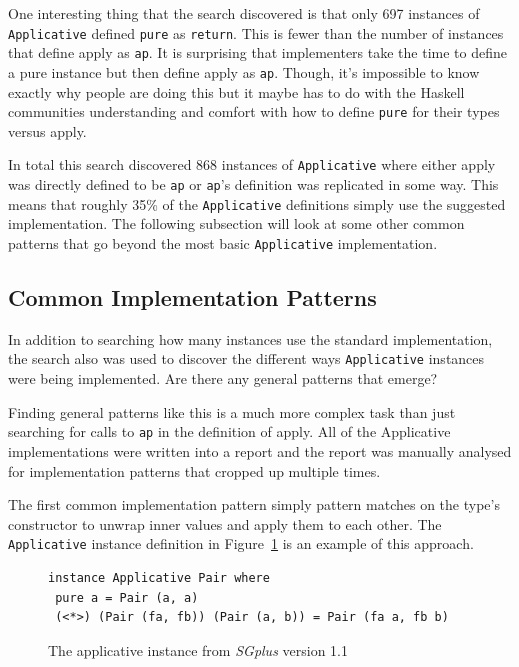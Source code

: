 One interesting thing that the search discovered is that only 697 instances of \texttt{Applicative} defined \texttt{pure} as \texttt{return}. This is fewer than the number of instances that define apply as \texttt{ap}. It is surprising that implementers take the time to define a pure instance but then define apply as \texttt{ap}. Though, it's impossible to know exactly why people are doing this but it maybe has to do with the Haskell communities understanding and comfort with how to define \texttt{pure} for their types versus apply. 

In total this search discovered 868 instances of \texttt{Applicative} where either apply was directly defined to be \texttt{ap} or \texttt{ap}'s definition was replicated in some way. This means that roughly 35\% of the \texttt{Applicative} definitions simply use the suggested implementation. The following subsection will look at some other common patterns that go beyond the most basic \texttt{Applicative} implementation.

\subsection{Common Implementation Patterns}

In addition to searching how many instances use the standard implementation, the search also was used to discover the different ways \texttt{Applicative} instances were being implemented. Are there any general patterns that emerge?

Finding general patterns like this is a much more complex task than just searching for calls to \texttt{ap} in the definition of apply. All of the Applicative implementations were written into a report and the report was manually analysed for implementation patterns that cropped up multiple times. 

The first common implementation pattern simply pattern matches on the type's constructor to unwrap inner values and apply them to each other. The \texttt{Applicative} instance definition in Figure~\ref{sgplusPair} is an example of this approach. 

\begin{figure}[t]
\begin{lstlisting}
instance Applicative Pair where
 pure a = Pair (a, a)
 (<*>) (Pair (fa, fb)) (Pair (a, b)) = Pair (fa a, fb b)
\end{lstlisting}
\caption{The applicative instance from \textit{SGplus} version 1.1}
\label{sgplusPair}
\end{figure}

